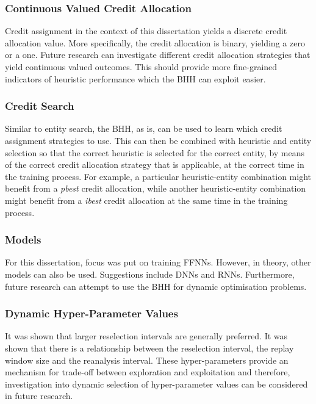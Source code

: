 \subsubsection{Continuous Valued Credit Allocation}
\label{sec:conclusion:further_research:continuous_credit}

Credit assignment in the context of this dissertation yields a discrete credit allocation value. More specifically, the credit allocation is binary, yielding a zero or a one. Future research can investigate different credit allocation strategies that yield continuous valued outcomes. This should provide more fine-grained indicators of heuristic performance which the \acs{BHH} can exploit easier.

\subsubsection{Credit Search}
\label{sec:conclusion:further_research:credit_search}

Similar to entity search, the \acs{BHH}, as is, can be used to learn which credit assignment strategies to use. This can then be combined with heuristic and entity selection so that the correct heuristic is selected for the correct entity, by means of the correct credit allocation strategy that is applicable, at the correct time in the training process. For example, a particular heuristic-entity combination might benefit from a \textit{pbest} credit allocation, while another heuristic-entity combination might benefit from a \textit{ibest} credit allocation at the same time in the training process.

\subsubsection{Models}
\label{sec:conclusion:further_research:models}

For this dissertation, focus was put on training \acp{FFNN}. However, in theory, other models can also be used. Suggestions include \acp{DNN} and \acp{RNN}. Furthermore, future research can attempt to use the \acs{BHH} for dynamic optimisation problems.


\subsubsection{Dynamic Hyper-Parameter Values}
\label{sec:conclusion:further_research:dynamic_hyper_parameters}

It was shown that larger reselection intervals are generally preferred. It was shown that there is a relationship between the reselection interval, the replay window size and the reanalysis interval. These hyper-parameters provide an mechanism for trade-off between exploration and exploitation and therefore, investigation into dynamic selection of hyper-parameter values can be considered in future research.

